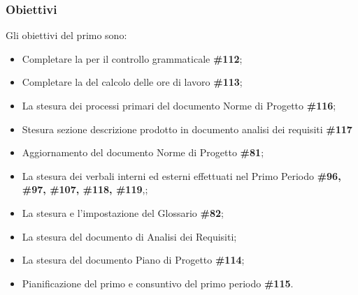 \subsubsection{Obiettivi}

Gli obiettivi del primo  sono:
\begin{itemize}
    \item Completare la  per il controllo grammaticale \textbf{\#112};
    \item Completare la  del calcolo delle ore di lavoro \textbf{\#113};
    \item La stesura dei processi primari del documento Norme di Progetto \textbf{\#116};
    \item Stesura sezione descrizione prodotto in documento analisi dei requisiti \textbf{\#117}
    \item Aggiornamento del documento Norme di Progetto \textbf{\#81};
    \item La stesura dei verbali interni ed esterni effettuati nel Primo Periodo \textbf{\#96, \#97, \#107, \#118, \#119},;
    \item La stesura e l'impostazione del Glossario \textbf{\#82};
    \item La stesura del documento di Analisi dei Requisiti;
    \item La stesura del documento Piano di Progetto \textbf{\#114};
    \item Pianificazione del primo  e consuntivo del primo periodo \textbf{\#115}.
\end{itemize}
